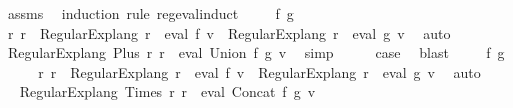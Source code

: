 \begin{isabellebody}
%
\isadelimproof
%
\endisadelimproof
%
\isatagproof
{}\isamarkupfalse%
\ assms\ \isamarkupfalse%
\ {\isacharparenleft}{\kern0pt}induction\ rule{\isacharcolon}{\kern0pt}\ reg{\isacharunderscore}{\kern0pt}eval{\isachardot}{\kern0pt}induct{\isacharparenright}{\kern0pt}\isanewline
\ \ \isamarkupfalse%
\ {\isacharparenleft}{\kern0pt}{}\ f\ g{\isacharparenright}{\kern0pt}\isanewline
\ \ \isamarkupfalse%
\ \isamarkupfalse%
\ r{}\ r{}\ \ {\isachardoublequoteopen}Regular{\isacharunderscore}{\kern0pt}Exp{\isachardot}{\kern0pt}lang\ r{}\ {\isacharequal}{\kern0pt}\ eval\ f\ v\ {\isasymand}\ Regular{\isacharunderscore}{\kern0pt}Exp{\isachardot}{\kern0pt}lang\ r{}\ {\isacharequal}{\kern0pt}\ eval\ g\ v{\isachardoublequoteclose}\ \isamarkupfalse%
\ auto\isanewline
\ \ \isamarkupfalse%
\ \isamarkupfalse%
\ {\isachardoublequoteopen}Regular{\isacharunderscore}{\kern0pt}Exp{\isachardot}{\kern0pt}lang\ {\isacharparenleft}{\kern0pt}Plus\ r{}\ r{}{\isacharparenright}{\kern0pt}\ {\isacharequal}{\kern0pt}\ eval\ {\isacharparenleft}{\kern0pt}Union\ f\ g{\isacharparenright}{\kern0pt}\ v{\isachardoublequoteclose}\ \isamarkupfalse%
\ simp\isanewline
\ \ \isamarkupfalse%
\ \isamarkupfalse%
\ {\isacharquery}{\kern0pt}case\ \isamarkupfalse%
\ blast\isanewline
{}\isamarkupfalse%
\isanewline
\ \ \isamarkupfalse%
\ {\isacharparenleft}{\kern0pt}{}\ f\ g{\isacharparenright}{\kern0pt}\isanewline
\ \ \isamarkupfalse%
\ \isamarkupfalse%
\ r{}\ r{}\ \ {\isachardoublequoteopen}Regular{\isacharunderscore}{\kern0pt}Exp{\isachardot}{\kern0pt}lang\ r{}\ {\isacharequal}{\kern0pt}\ eval\ f\ v\ {\isasymand}\ Regular{\isacharunderscore}{\kern0pt}Exp{\isachardot}{\kern0pt}lang\ r{}\ {\isacharequal}{\kern0pt}\ eval\ g\ v{\isachardoublequoteclose}\ \isamarkupfalse%
\ auto\isanewline
\ \ \isamarkupfalse%
\ \isamarkupfalse%
\ {\isachardoublequoteopen}Regular{\isacharunderscore}{\kern0pt}Exp{\isachardot}{\kern0pt}lang\ {\isacharparenleft}{\kern0pt}Times\ r{}\ r{}{\isacharparenright}{\kern0pt}\ {\isacharequal}{\kern0pt}\ eval\ {\isacharparenleft}{\kern0pt}Concat\ f\ g{\isacharparenright}{\kern0pt}\ v{\isachardoublequoteclose}\ \isamarkupfalse%

\end{isabellebody}
